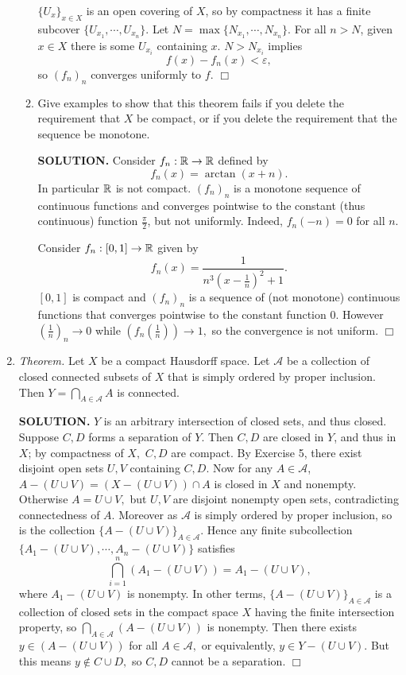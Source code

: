 \documentclass{article}
\begin{document}
\begin{enumerate}
\begin{enumerate}
        $\{U_x\}_{x \in X}$ is an open covering of $X$, so by compactness it has a finite subcover $\{U_{x_1}, \cdots, U_{x_n}\}.$ Let $N = \max \{N_{x_1}, \cdots, N_{x_n}\}.$ For all $n > N$, given $x \in X$ there is some $U_{x_i}$ containing $x$. $N > N_{x_i}$ implies
        $$f(x) - f_n(x) < \varepsilon,$$
        so $(f_n)_n$ converges uniformly to $f.$ $\Box$
    
        \item Give examples to show that this theorem fails if you delete the requirement that $X$ be compact, or if you delete the requirement that the sequence be monotone.

        {\bf SOLUTION.} Consider $f_n: \mathbb{R} \rightarrow \mathbb{R}$ defined by
        $$f_n(x) = \arctan(x+n).$$
        In particular $\mathbb{R}$ is not compact. $(f_n)_n$ is a monotone sequence of continuous functions and converges pointwise to the constant (thus continuous) function $\frac{\pi}{2}$, but not uniformly. Indeed, $f_n(-n) = 0$ for all $n.$

        Consider $f_n: [0, 1] \rightarrow \mathbb{R}$ given by
        $$f_n(x) = \frac{1}{n^3(x-\frac1n)^2+ 1}.$$
        $[0, 1]$ is compact and $(f_n)_n$ is a sequence of (not monotone) continuous functions that converges pointwise to the constant function $0$. However $(\frac1n)_n \rightarrow 0$ while $(f_n(\frac1n)) \rightarrow 1,$ so the convergence is not uniform. $\Box$
    \end{enumerate}

    \item {\it Theorem.} Let $X$ be a compact Hausdorff space. Let $\mathcal{A}$ be a collection of closed connected subsets of $X$ that is simply ordered by proper inclusion. Then $Y = \bigcap_{A \in \mathcal{A}} A$ is connected.

    {\bf SOLUTION.} $Y$ is an arbitrary intersection of closed sets, and thus closed. Suppose $C, D$ forms a separation of $Y.$ Then $C, D$ are closed in $Y$, and thus in $X$; by compactness of $X,$ $C, D$ are compact. By Exercise 5, there exist disjoint open sets $U, V$ containing $C, D.$ Now for any $A \in \mathcal{A}$, $A- (U \cup V) = (X-(U \cup V)) \cap A$ is closed in $X$ and nonempty. Otherwise $A = U \cup V,$ but $U, V$ are disjoint nonempty open sets, contradicting connectedness of $A.$ Moreover as $\mathcal{A}$ is simply ordered by proper inclusion, so is the collection $\{A-(U \cup V)\}_{A\in \mathcal{A}}.$ Hence any finite subcollection $\{A_1 - (U\cup V), \cdots, A_n - (U \cup V)\}$ satisfies
    $$\bigcap_{i=1}^n (A_1 - (U\cup V)) = A_1 - (U \cup V),$$
    where $A_1 - (U \cup V)$ is nonempty. In other terms, $\{A-(U \cup V)\}_{A\in \mathcal{A}}$ is a collection of closed sets in the compact space $X$ having the finite intersection property, so $\bigcap_{A \in \mathcal{A}} (A-(U \cup V))$ is nonempty. Then there exists $y \in (A - (U \cup V))$ for all $A \in \mathcal{A},$ or equivalently, $y \in Y - (U \cup V).$ But this means $y \notin C \cup D,$ so $C, D$ cannot be a separation. $\Box$


\end{enumerate}
\end{document}
